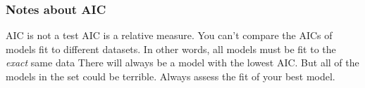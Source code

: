 \documentclass[color=usenames,dvipsnames]{beamer}\usepackage[]{graphicx}\usepackage[]{color}
\begin{document}







\begin{frame}
  \frametitle{Notes about AIC}
    AIC is not a test
    \pause
    \vfill
    AIC is a relative measure. You can't compare the AICs of
      models fit to different datasets.
    \pause
    \vfill
    In other words, all models must be fit to the {\it
        exact} same data
    \pause
    \vfill
    There will always be a model with the lowest AIC. But all of
      the models in the set could be terrible.
    \pause
    \vfill
    Always assess the fit of your best model.
\end{frame}
\end{document}
